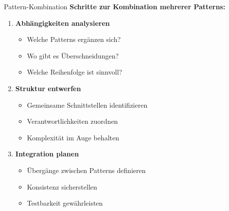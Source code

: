 \begin{KR}{Pattern-Kombination}
\textbf{Schritte zur Kombination mehrerer Patterns:}
\begin{enumerate}
    \item \textbf{Abhängigkeiten analysieren}
    \begin{itemize}
        \item Welche Patterns ergänzen sich?
        \item Wo gibt es Überschneidungen?
        \item Welche Reihenfolge ist sinnvoll?
    \end{itemize}
    
    \item \textbf{Struktur entwerfen}
    \begin{itemize}
        \item Gemeinsame Schnittstellen identifizieren
        \item Verantwortlichkeiten zuordnen
        \item Komplexität im Auge behalten
    \end{itemize}
    
    \item \textbf{Integration planen}
    \begin{itemize}
        \item Übergänge zwischen Patterns definieren
        \item Konsistenz sicherstellen
        \item Testbarkeit gewährleisten
    \end{itemize}
\end{enumerate}
\end{KR}

